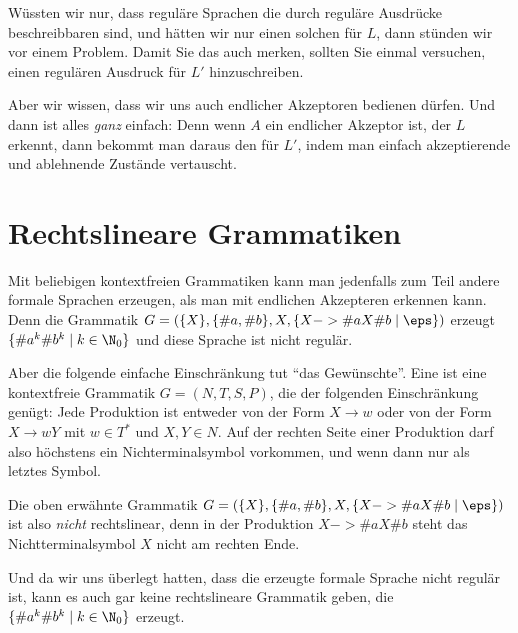 Wüssten wir nur, dass reguläre Sprachen die durch reguläre Ausdrücke
beschreibbaren sind, und hätten wir nur einen solchen für $L$, dann
stünden wir vor einem Problem. Damit Sie das auch merken, sollten Sie
einmal versuchen, einen regulären Ausdruck für $L'$ hinzuschreiben.

Aber wir wissen, dass wir uns auch endlicher Akzeptoren bedienen
dürfen. Und dann ist alles \emph{ganz} einfach: Denn wenn $A$ ein
endlicher Akzeptor ist, der $L$ erkennt, dann bekommt man daraus den
für $L'$, indem man einfach akzeptierende und ablehnende Zustände
vertauscht.

\Tut\section{Rechtslineare Grammatiken}
\label{sec:rechtslineare-grammatiken}

Mit beliebigen kontextfreien Grammatiken kann man jedenfalls zum Teil
andere formale Sprachen erzeugen, als man mit endlichen Akzepteren
erkennen kann. Denn die Grammatik $G=(\{X\}, \{\#a,\#b\}, X, \{X-> \#a
X \#b\mid \eps\})$ erzeugt $\{\#a^k\#b^k \mid k\in\N_0\}$ und diese
Sprache ist nicht regulär.

Aber die folgende einfache Einschränkung tut "`das Gewünschte"'.
Eine  ist eine kontextfreie
Grammatik $G=(N,T,S,P)$, die der folgenden Einschränkung genügt: Jede
Produktion ist entweder von der Form $X\to w$ oder von der Form $X\to
wY$ mit $w\in T^*$ und $X,Y\in N$. Auf der rechten Seite einer
Produktion darf also höchstens ein Nichterminalsymbol vorkommen, und
wenn dann nur als letztes Symbol. 

Die oben erwähnte Grammatik $G=(\{X\}, \{\#a,\#b\}, X, \{X-> \#a X
\#b\mid \eps\})$ ist also \emph{nicht} rechtslinear, denn in der
Produktion $X-> \#a X \#b$ steht das Nichtterminalsymbol $X$ nicht am
rechten Ende.

Und da wir uns überlegt hatten, dass die erzeugte formale Sprache nicht
regulär ist, kann es auch gar keine rechtslineare Grammatik geben, die
$\{\#a^k\#b^k \mid k\in\N_0\}$ erzeugt.

